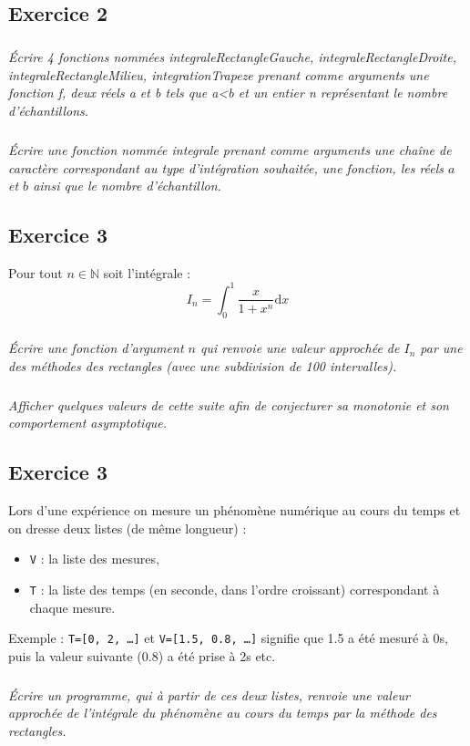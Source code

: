 \documentclass[10pt,oneside]{article}
\begin{document}
\subsection*{Exercice 2}
\setcounter{subparagraph}{0}
\subparagraph{}
\textit{Écrire 4 fonctions nommées \textsf{integraleRectangleGauche}, \textsf{integraleRectangleDroite},
\textsf{integraleRectangleMilieu}, \textsf{integrationTrapeze} prenant comme arguments une fonction \textsf{f}, deux réels  \textsf{a} et \textsf{b} tels que \textsf{a<b} et un entier \textsf{n} représentant le nombre d'échantillons.}
 
\subparagraph{}
\textit{Écrire une fonction nommée \textsf{integrale} prenant comme arguments une chaîne de caractère correspondant au type d'intégration souhaitée, une fonction, les réels $a$ et $b$ ainsi que le nombre d'échantillon.}
 



\subsection*{Exercice 3}
\setcounter{subparagraph}{0} 
Pour tout $n\in\mathbb{N}$ soit l'intégrale : 
$$I_n=\int_0^1\frac{x}{1+x^n} \text{d}x$$

\subparagraph{}
\textit{Écrire une fonction d'argument $n$ qui renvoie une valeur approchée de $I_n$ par une des méthodes des rectangles (avec une subdivision de 100 intervalles).}

\subparagraph{}
\textit{Afficher quelques  valeurs de cette suite afin de conjecturer sa monotonie et son comportement asymptotique.}

\subsection*{Exercice 3}
\setcounter{subparagraph}{0}
Lors d'une expérience on mesure un phénomène numérique au cours du temps et on dresse deux listes (de même longueur) :
\begin{itemize}
\item \texttt{V} : la liste des mesures, 
\item \texttt{T} : la liste des temps (en seconde, dans l'ordre croissant) correspondant à chaque mesure.
\end{itemize}
Exemple : \texttt{T=[0, 2, \ldots]} et \texttt{V=[1.5, 0.8, \ldots]} signifie que 1.5 a été mesuré à 0s, puis la valeur suivante  (0.8) a été prise à 2s etc.

\subparagraph{}
\textit{Écrire un programme, qui à partir de ces deux listes, renvoie une valeur approchée de l'intégrale du phénomène au cours du temps par la méthode des rectangles.}
\end{document}
